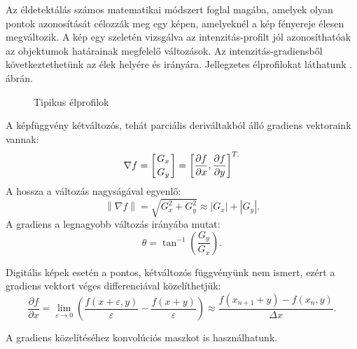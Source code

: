 
Az éldetektálás számos matematikai módszert foglal magába, amelyek olyan pontok azonosítását célozzák meg egy képen, amelyeknél a kép fényereje élesen megváltozik. A kép egy szeletén vizsgálva az intenzitás-profilt jól azonosíthatóak az objektumok határainak megfelelő változások. Az intenzitás-gradiensből következtethetünk az élek helyére és irányára. Jellegzetes élprofilokat láthatunk . ábrán.

\begin{figure}[ht]
\centering
{}
\caption{Tipikus élprofilok} 
\label{fig:elprofilok}
\end{figure}

A képfüggvény kétváltozós, tehát parciális deriváltakból álló gradiens vektoraink vannak: 
$$
\nabla f =
\left[ \genfrac{}{}{0pt}{}{G_x}{G_y} \right] =
\left[ \frac{\partial f}{\partial x}, \frac{\partial f}{\partial y}  \right]^{T.}$$
A hossza a változás nagyságával egyenlő: 
$$
\left\| \nabla f \right \| =
\sqrt{G_{x}^{2}+G_{y}^{2}} \approx
\left | G_x  \right |+\left | G_y  \right |.
$$
A gradiens a legnagyobb változás irányába mutat: 
$$
\theta = \tan^{-1}\left(\frac{G_y}{G_x}\right).
$$

Digitális képek esetén a pontos, kétváltozós függvényünk nem ismert, ezért a gradiens vektort véges differenciával közelíthetjük:
$$
\frac{\partial f}{\partial x} =
\lim_{\varepsilon \to 0} \left(
\frac{f(x+\varepsilon,y)}{\varepsilon}-\frac{f(x+y)}{\varepsilon}
\right) \approx
\frac{f(x_{n+1}+y)-f(x_n,y)}{\Delta x}.
$$

A gradiens közelítéséhez konvolúciós maszkot is használhatunk.




